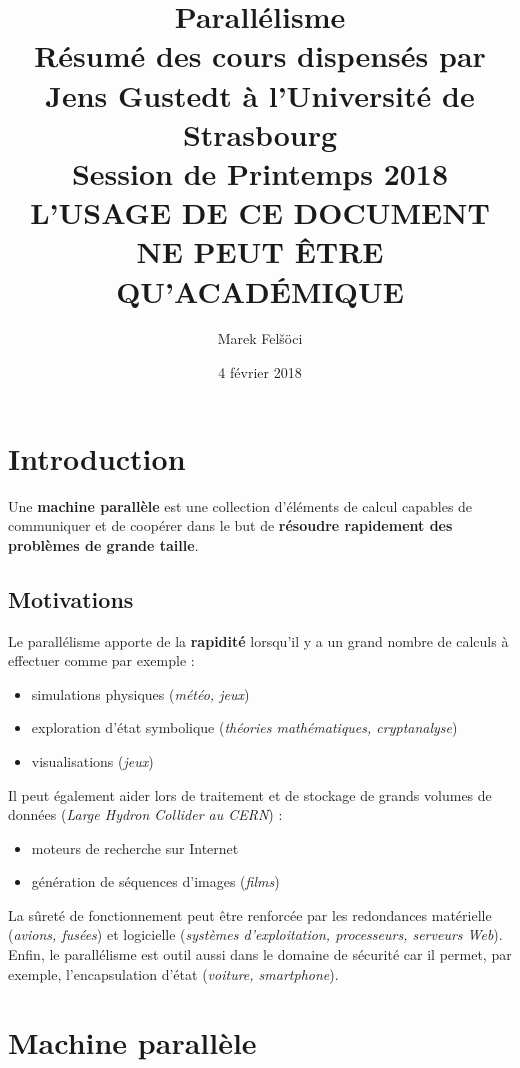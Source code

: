 \documentclass[12pt, a4paper]{article}
\title{%
  \textbf{Parallélisme} \\
  \Large Résumé des cours dispensés par Jens Gustedt à l'Université de
  Strasbourg \\
  \large Session de Printemps 2018 \\
  \huge L'USAGE DE CE DOCUMENT NE PEUT ÊTRE QU'ACADÉMIQUE
}
\author{Marek Felšöci}
\date{4 février 2018}
\begin{document}
  \maketitle
  \newpage
  \section{Introduction}
    Une \textbf{machine parallèle} est une collection d'éléments de calcul
    capables de communiquer et de coopérer dans le but de \textbf{résoudre
    rapidement des problèmes de grande taille}.
    \subsection{Motivations}
      Le parallélisme apporte de la \textbf{rapidité} lorsqu'il y a un grand
      nombre de calculs à effectuer comme par exemple :
      \begin{itemize}
        \item simulations physiques (\textit{météo, jeux})
        \item exploration d'état symbolique (\textit{théories mathématiques,
        cryptanalyse})
        \item visualisations (\textit{jeux})
      \end{itemize}
      Il peut également aider lors de traitement et de stockage de grands
      volumes de données (\textit{Large Hydron Collider au CERN}) :
      \begin{itemize}
        \item moteurs de recherche sur Internet
        \item génération de séquences d'images (\textit{films})
      \end{itemize}
      La sûreté de fonctionnement peut être renforcée par les redondances
      matérielle (\textit{avions, fusées}) et logicielle (\textit{systèmes
      d'exploitation, processeurs, serveurs Web}). Enfin, le parallélisme est
      outil aussi dans le domaine de sécurité car il permet, par exemple,
      l'encapsulation d'état (\textit{voiture, smartphone}).
  \section{Machine parallèle}
\end{document}
